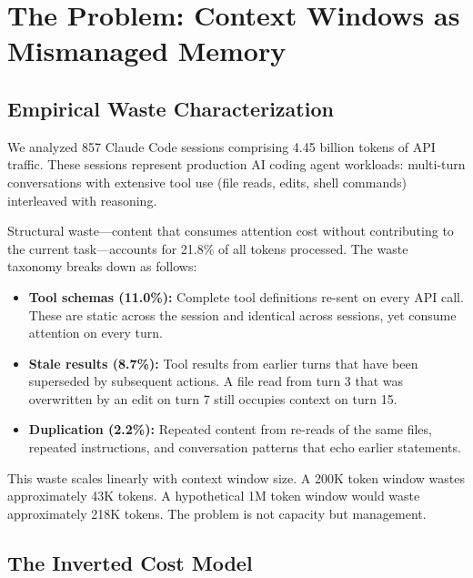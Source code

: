 \documentclass[sigplan,screen,anonymous]{acmart}
\begin{document}

\section{The Problem: Context Windows as Mismanaged Memory}
\label{sec:problem}

\subsection{Empirical Waste Characterization}

We analyzed 857 Claude Code sessions comprising 4.45 billion tokens of
API traffic. These sessions represent production AI coding agent
workloads: multi-turn conversations with extensive tool use (file
reads, edits, shell commands) interleaved with reasoning.

Structural waste---content that consumes attention cost without
contributing to the current task---accounts for 21.8\% of all tokens
processed. The waste taxonomy breaks down as follows:

\begin{itemize}
\item \textbf{Tool schemas (11.0\%):} Complete tool definitions
  re-sent on every API call. These are static across the session and
  identical across sessions, yet consume attention on every turn.

\item \textbf{Stale results (8.7\%):} Tool results from earlier turns
  that have been superseded by subsequent actions. A file read from
  turn 3 that was overwritten by an edit on turn 7 still occupies
  context on turn 15.

\item \textbf{Duplication (2.2\%):} Repeated content from
  re-reads of the same files, repeated instructions, and
  conversation patterns that echo earlier statements.
\end{itemize}

This waste scales linearly with context window size. A 200K token
window wastes approximately 43K tokens. A hypothetical 1M token window
would waste approximately 218K tokens. The problem is not capacity
but management.

\subsection{The Inverted Cost Model}
\label{sec:cost-model}
\end{document}
